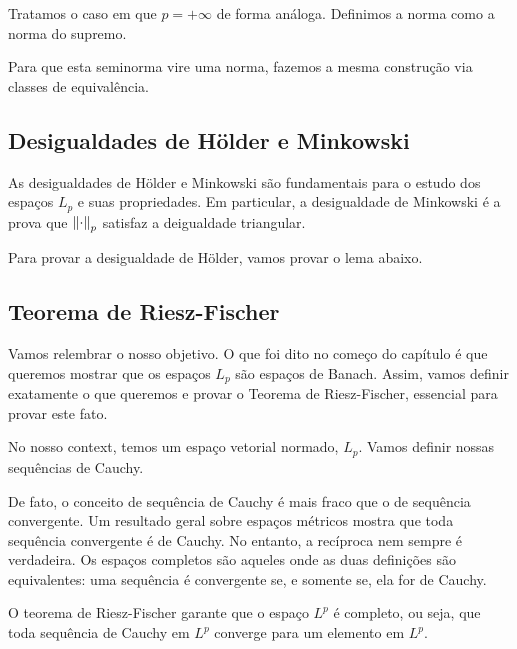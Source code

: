 \LpSpace

Tratamos o caso em que $p=+\infty$ de forma análoga. Definimos a norma como a norma do supremo.

\functionInftySeminorm

Para que esta seminorma vire uma norma, fazemos a mesma construção via classes de equivalência.

\LinftySpace

\subsection{Desigualdades de Hölder e Minkowski}

As desigualdades de Hölder e Minkowski são fundamentais para o estudo dos espaços $L_p$ e suas propriedades. Em particular, a desigualdade de Minkowski é a prova que $\left\lVert \cdot \right\rVert_p$ satisfaz a deigualdade triangular.

Para provar a desigualdade de Hölder, vamos provar o lema abaixo.

\powerInequality

\holder

\minkowski

\subsection{Teorema de Riesz-Fischer}

Vamos relembrar o nosso objetivo. O que foi dito no começo do capítulo é que queremos mostrar que os espaços $L_p$ são espaços de Banach. Assim, vamos definir exatamente o que queremos e provar o Teorema de Riesz-Fischer, essencial para provar este fato.

\banachSpace

No nosso context, temos um espaço vetorial normado, $L_p$. Vamos definir nossas sequências de Cauchy.

\cauchySequenceLp

De fato, o conceito de sequência de Cauchy é mais fraco que o de sequência convergente. Um resultado geral sobre espaços métricos mostra que toda sequência convergente é de Cauchy. No entanto, a recíproca nem sempre é verdadeira. Os espaços completos são aqueles onde as duas definições são equivalentes: uma sequência é convergente se, e somente se, ela for de Cauchy.

O teorema de Riesz-Fischer garante que o espaço $L^p$ é completo, ou seja, que toda sequência de Cauchy em $L^p$ converge para um elemento em $L^p$.

